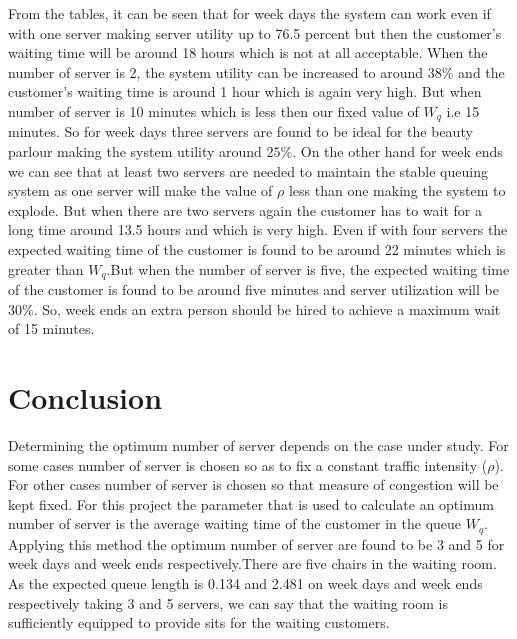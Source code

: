 \documentclass{article}
\theoremstyle{definition}
\begin{document}
	
From the tables, it can be seen that for week days the system can work even if with one server making server utility up to 76.5 percent but then the customer's waiting time will be around 18 hours which is not at all acceptable. When the number of server is 2, the system utility can be increased to around $38\%$ and the customer's waiting time is around 1 hour which is again very high. But when number of server is 10 minutes which is less then our fixed value of $W_{q}$ i.e 15 minutes. So for week days three servers are found to be ideal for the beauty parlour making the system utility around $25\%$. On the other hand for week ends we can see that at least two servers are needed to maintain the stable queuing system as one server will make the value of $\rho$ less than one making the system to explode. But when there are two servers again the customer has to wait for a long time around 13.5 hours and which is very high. Even if with four servers the expected waiting time of the customer is found to be around 22 minutes which is greater than $W_{q}$.But when the number of server is five, the expected waiting time of the customer is found to be around five minutes and server utilization will be $30\%$.  So, week ends an extra person should be hired to achieve a maximum wait of 15 minutes. 


\section{Conclusion}
Determining the optimum number of server depends on the case under study. For some cases number of server is chosen so as to fix a constant traffic intensity ($\rho$). For other cases number of server is chosen so that measure of congestion will be kept fixed. For this project the parameter that is used to calculate an optimum number of server is the average waiting time of the customer in the queue $W_{q}$. Applying this method the optimum number of server are found to be 3 and 5 for week days and week ends respectively.There are five chairs in the waiting room. As the expected queue length is 0.134 and 2.481 on week days and week ends respectively taking 3 and 5 servers, we can say that the waiting room is sufficiently equipped to provide sits for the waiting customers.
\end{document}
